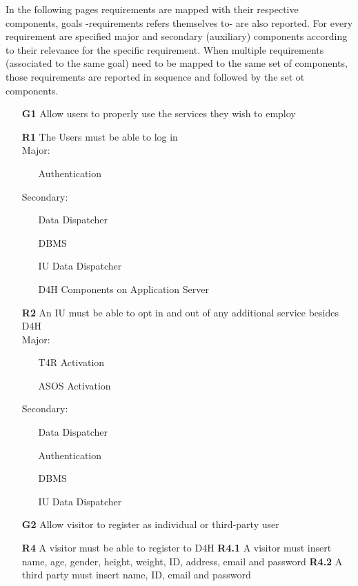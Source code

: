 In the following pages requirements are mapped with their respective components, goals -requirements refers themselves to- are also reported. For every requirement are specified major and secondary (auxiliary) components according to their relevance for the specific requirement.
When multiple requirements (associated to the same goal) need to be mapped to the same set of components, those requirements are reported in sequence and followed by the set ot components. \\

\begin{itemize}
\item [\textbf{G1}] Allow users to properly use the services they wish to employ 

\subitem \textbf{R1} The Users must be able to log in \\

Major:
\begin{itemize}
\item[\textbullet] Authentication  
\end{itemize}
Secondary:
\begin{itemize}
\item[\textbullet] Data Dispatcher
\item[\textbullet] DBMS
\item[\textbullet] IU Data Dispatcher
\item[\textbullet] D4H Components on Application Server
\end{itemize}
\subitem \textbf{R2} An IU must be able to opt in and out of any additional service besides D4H\\

Major:
\begin{itemize}
\item[\textbullet]T4R Activation
\item[\textbullet]ASOS Activation
\end{itemize}
Secondary:
\begin{itemize}
\item[\textbullet]Data Dispatcher 
\item[\textbullet]Authentication
\item[\textbullet]DBMS
\item[\textbullet]IU Data Dispatcher
\end{itemize}
\item [\textbf{G2}] Allow visitor to register as individual or third-party user 

\subitem \textbf{R4} A visitor must be able to register to D4H 
\subitem \textbf{R4.1} A visitor must insert name, age, gender, height, weight, ID, address, email and password
\subitem \textbf{R4.2} A third party must insert name, ID, email and password\\


\end{itemize}
